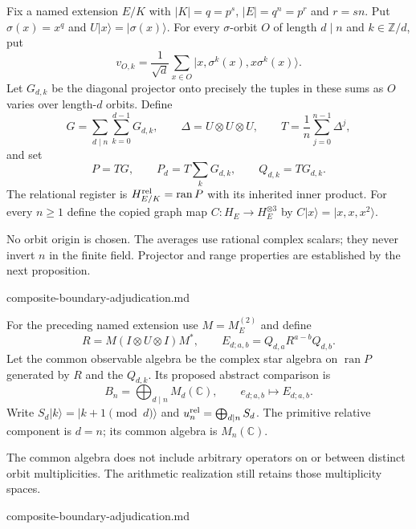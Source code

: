 \begin{definition}
Fix a named extension $E/K$ with $|K|=q=p^s$, $|E|=q^n=p^r$ and $r=sn$.
Put $\sigma(x)=x^q$ and $U|x\rangle=|\sigma(x)\rangle$. For every
$\sigma$-orbit $O$ of length $d\mid n$ and $k\in\mathbb Z/d$, put
\[
 v_{O,k}=\frac1{\sqrt d}\sum_{x\in O}
       |x,\sigma^k(x),x\sigma^k(x)\rangle.
\]
Let $G_{d,k}$ be the diagonal projector onto precisely the tuples in these
sums as $O$ varies over length-$d$ orbits. Define
\[
 G=\sum_{d\mid n}\sum_{k=0}^{d-1}G_{d,k},\qquad
 \Delta=U\otimes U\otimes U,\qquad
 T=\frac1n\sum_{j=0}^{n-1}\Delta^j,
\]
and set
\[
 P=TG,\qquad P_d=T\sum_kG_{d,k},\qquad Q_{d,k}=TG_{d,k}.
\]
The relational register is $H_{E/K}^{\rm rel}=\operatorname{ran}P$ with
its inherited inner product. For every $n\geq1$ define the copied graph map
$C:H_E\to H_E^{\otimes3}$ by $C|x\rangle=|x,x,x^2\rangle$.
\end{definition}
\begin{scope}
No orbit origin is chosen. The averages use rational complex scalars;
they never invert $n$ in the finite field. Projector and range properties
are established by the next proposition.
\end{scope}
{composite-boundary-adjudication.md}

\begin{definition}
For the preceding named extension use $M=M_E^{(2)}$ and define
\[
 R=M(I\otimes U\otimes I)M^*,\qquad
 E_{d;a,b}=Q_{d,a}R^{a-b}Q_{d,b}.
\]
Let the common observable algebra be the complex star algebra on
$\operatorname{ran}P$ generated by $R$ and the $Q_{d,k}$. Its proposed
abstract comparison is
\[
 B_n=\bigoplus_{d\mid n}M_d(\mathbb C),\qquad
 e_{d;a,b}\longmapsto E_{d;a,b}.
\]
Write $S_d|k\rangle=|k+1\pmod d\rangle$ and
$u_n^{\rm rel}=\bigoplus_{d\mid n}S_d$. The primitive relative component
is $d=n$; its common algebra is $M_n(\mathbb C)$.
\end{definition}
\begin{scope}
The common algebra does not include arbitrary operators on or between
distinct orbit multiplicities. The arithmetic realization still retains
those multiplicity spaces.
\end{scope}
{composite-boundary-adjudication.md}

